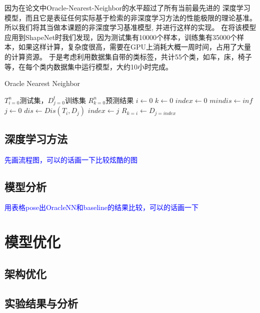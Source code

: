 \documentclass[bachelor, nocolorlinks, printoneside]{seuthesis} %
\newcommand\TODO[1]{\textcolor{blue}{#1}}
\begin{document}
\begin{Main}
因为在论文\cite{tatarchenko2019single}中Oracle-Nearest-Neighbor的水平超过了所有当前最先进的
深度学习模型，而且它是表征任何实际基于检索的非深度学习方法的性能极限的理论基准。所以我们将其当做本课题的非深度学习基准模型, 并进行这样的实现\cite{OracleNN}。
在将该模型应用到ShapeNet时我们发现，因为测试集有10000个样本，训练集有35000个样本，如果这样计算，复杂度很高，需要在GPU上消耗大概一周时间，占用了大量的计算资源。
于是考虑利用数据集自带的类标签，共计55个类，如车，床，椅子等，在每个类内数据集中运行模型\cite{OracleNN}，大约10小时完成。

\begin{algorithm}
    \label{OracleNN}
    \caption{Oracle Nearest Neighbor}
    \begin{algorithmic}[1] %
        \Require ${T^{n}_{i=0}}$测试集，${D^{t}_{j=0}}$训练集
        \Ensure ${R^{n}_{k=0}}$预测结果
        \State $i \gets 0$
        \State $k \gets 0$
            \State $index \gets 0$
            \State $mindis \gets inf$
            \State $j \gets 0$
                \State $dis \gets Dis(T_i, D_j)$
                        \State $index \gets j$
                    \EndIf
            \EndWhile
        \State $R_{k=i} \gets D_{j=index}$
        \EndWhile
    \end{algorithmic}
\end{algorithm}

\subsection{深度学习方法}
\TODO{先画流程图，可以的话画一下比较炫酷的图}
\subsection{模型分析}
\TODO{用表格pose出OracleNN和baseline的结果比较，可以的话画一下}

\section{模型优化}
\subsection{架构优化}
\subsection{实验结果与分析}

\end{Main}
\end{document}
